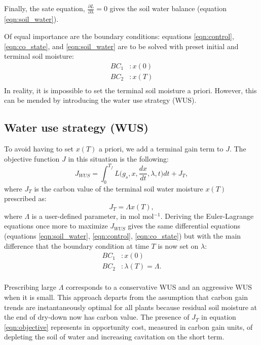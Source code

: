 \documentclass[utf8]{frontiersSCNS} %
\begin{document}
Finally, the sate equation, $\frac{\partial L}{\partial \lambda} = 0$ gives the soil water balance (equation \ref{eqn:soil_water}). 

Of equal importance are the boundary conditions: equations \ref{eqn:control}, \ref{eqn:co_state}, and \ref{eqn:soil_water} are to be solved with preset initial and terminal soil moisture:
\begin{equation}
    \label{eqn: BC_no_WUS}
    \begin{split}
        BC_1 &:x(0)\\
        BC_2 &:x(T)\\
    \end{split}
\end{equation}
In reality, it is impossible to set the terminal soil moisture a priori. However, this can be mended by introducing the water use strategy (WUS).

\subsection{Water use strategy (WUS)}

To avoid having to set $x(T)$ a priori, we add a terminal gain term to $J$. The objective function $J$ in this situation is the following:
\begin{equation}
    \label{eqn:objective}
    J_{WUS} = \int_0^{T_f} L\Big(g_s, x, \frac{dx}{dt},\lambda,t \Big) dt + J_{T},
\end{equation}
where $J_{T}$ is the carbon value of the terminal soil water moisture $x(T)$ prescribed as:
\begin{equation}
    \label{eqn:terminal_gain}
    J_{T} = \Lambda x(T),
\end{equation}
where $\Lambda$ is a user-defined parameter, in mol mol$^{-1}$. Deriving the Euler-Lagrange equations once more to maximize $J_{WUS}$ gives the same differential equations (equations \ref{eqn:soil_water}, \ref{eqn:control}, \ref{eqn:co_state}) but with the main difference that the boundary condition at time $T$ is now set on $\lambda$: 
\begin{equation}
\label{eqn: BC_WUS}
    \begin{split}
        BC_1 &:x(0)\\
        BC_2 &:\lambda(T) = \Lambda.\\
    \end{split}
\end{equation}

Prescribing large $\Lambda$ corresponds to a conservative WUS and an aggressive WUS when it is small. This approach departs from the assumption that carbon gain trends are instantaneously optimal for all plants because residual soil moisture at the end of dry-down now has carbon value. The presence of $J_{T}$ in equation \ref{eqn:objective} represents in opportunity cost, measured in carbon gain units, of depleting the soil of water and increasing cavitation on the short term.
\end{document}
